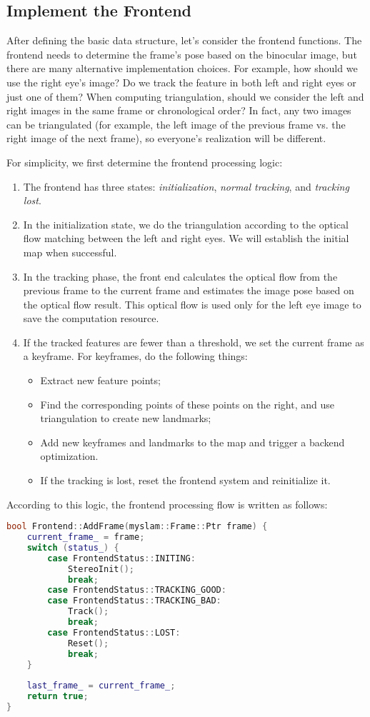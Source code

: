 \subsection{Implement the Frontend}
After defining the basic data structure, let's consider the frontend functions. The frontend needs to determine the frame's pose based on the binocular image, but there are many alternative implementation choices. For example, how should we use the right eye's image? Do we track the feature in both left and right eyes or just one of them? When computing triangulation, should we consider the left and right images in the same frame or chronological order? In fact, any two images can be triangulated (for example, the left image of the previous frame vs. the right image of the next frame), so everyone's realization will be different.

For simplicity, we first determine the frontend processing logic:
\begin{enumerate}
	\item The frontend has three states: \textit{initialization}, \textit{normal tracking}, and \textit{tracking lost}.
	\item In the initialization state, we do the triangulation according to the optical flow matching between the left and right eyes. We will establish the initial map when successful.
	\item In the tracking phase, the front end calculates the optical flow from the previous frame to the current frame and estimates the image pose based on the optical flow result. This optical flow is used only for the left eye image to save the computation resource.
	\item If the tracked features are fewer than a threshold, we set the current frame as a keyframe. For keyframes, do the following things:
	
	\begin{itemize}
		\item Extract new feature points;
		\item Find the corresponding points of these points on the right, and use triangulation to create new landmarks;
		\item Add new keyframes and landmarks to the map and trigger a backend optimization.
		\item If the tracking is lost, reset the frontend system and reinitialize it.
	\end{itemize}
\end{enumerate}

According to this logic, the frontend processing flow is written as follows:
\begin{lstlisting}[language=c++,caption=slambook2/ch13/src/frontend.cpp]
bool Frontend::AddFrame(myslam::Frame::Ptr frame) {
	current_frame_ = frame;
	switch (status_) {
		case FrontendStatus::INITING:
			StereoInit();
			break;
		case FrontendStatus::TRACKING_GOOD:
		case FrontendStatus::TRACKING_BAD:
			Track();
			break;
		case FrontendStatus::LOST:
			Reset();
			break;
	}
	
	last_frame_ = current_frame_;
	return true;
}
\end{lstlisting}

